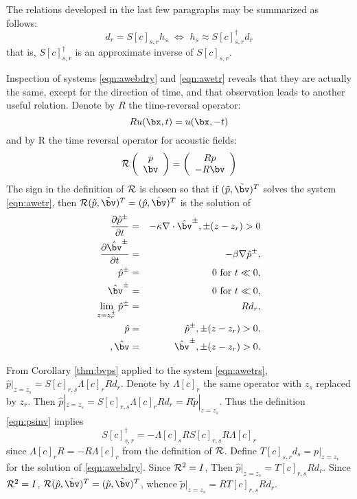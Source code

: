The relations developed in the last few paragraphs may be summarized as follows:
\begin{equation}
\label{eqn:appinv}
d_r = S[c]_{s,r}h_s \,\,\Leftrightarrow \,\, h_s \approx S[c]_{s,r}^{\dagger}d_r
\end{equation}
that is, $S[c]_{s,r}^{\dagger}$ is an approximate inverse of $S[c]_{s,r}$.

Inspection of systems \ref{eqn:awebdry} and \ref{eqn:awetr} reveals that they are actually the same, except for the direction of time, and that observation leads to another useful relation. Denote by $R$ the time-reversal operator:
\[
Ru(\bx,t)=u(\bx,-t)
\]
and by {\cal R} the time reversal operator for acoustic fields:
\[
{\cal R}\left(\begin{array}{c}
p\\
\bv
\end{array}
\right) = 
\left(\begin{array}{c}
Rp\\
-R\bv
\end{array}
\right) 
\]
The sign in the definition of ${\cal R}$ is chosen so that if $(\tilde{p},\tilde{\bv})^T$ solves the system \ref{eqn:awetr}, then ${\cal R}(\tilde{p},\tilde{\bv})^T=(\hat{p},\hat{\bv})^T$ is the solution of 
\begin{eqnarray}
\label{eqn:awetrs}
\frac{\partial \hat{p}^{\pm}}{\partial t} & = & - \kappa \nabla \cdot \hat{\bv}^{\pm}, \pm(z-z_r) > 0 \nonumber \\
\frac{\partial \hat{\bv}^{\pm}}{\partial t} & = & - \beta \nabla \hat{p}^{\pm},\nonumber \\
\hat{p}^{\pm} & =& 0 \mbox{ for } t \ll 0,\nonumber\\ 
\hat{\bv}^{\pm} & = & 0 \mbox{ for } t \ll 0,\nonumber\\
\lim _{z=z_r^{\pm}}\hat{p}^{\pm} &=&  Rd_r,\nonumber\\
\hat{p} &=& \hat{p}^{\pm}, \pm(z-z_r)>0, \nonumber\\, 
\hat{\bv} &=& \hat{\bv}^{\pm}, \pm(z-z_r)>0.
\end{eqnarray} 


 From Corollary \ref{thm:bvps} applied to the system \ref{eqn:awetrs}, $\hat{p}|_{z=z_s} = S[c]_{r,s}\Lambda[c]_rRd_r$. Denote by $\Lambda[c]_r$ the same operator with $z_s$ replaced by $z_r$. Then $\hat{p}|_{z=z_s} = S[c]_{r,s}\Lambda[c]_rRd_r=R\tilde{p}|_{z=z_s}$. Thus the definition \ref{eqn:psinv} implies
\begin{equation}
\label{eqn:psinvrev}
S[c]_{s,r}^{\dagger}= -\Lambda[c]_sRS[c]_{r,s}R\Lambda[c]_r
\end{equation}
since $\Lambda[c]_rR=-R\Lambda[c]_r$ from the definition of ${\cal R}$.
Define $T[c]_{s,r}d_s = p|_{z=z_r}$ for the solution of \ref{eqn:awebdry}. Since ${\cal R}^2=I$, Then $\hat{p}|_{z=z_s} = T[c]_{r,s}Rd_r$. Since ${\cal R}^2=I$, ${\cal R}(\hat{p},\hat{\bv})^T=(\tilde{p},\tilde{\bv})^T$, whence $\tilde{p}|_{z=z_s}=RT[c]_{r,s}Rd_r$.

